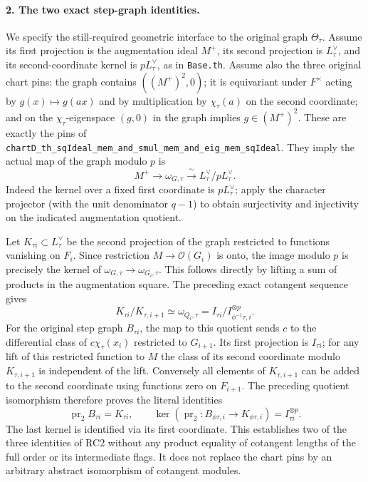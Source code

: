 \paragraph{2. The two exact step-graph identities.}
We specify the still-required geometric interface to the
original graph \(\Theta_\tau\).
Assume its first projection is the augmentation ideal \(M^+\),
its second projection is \(L_\tau^\vee\), and its second-coordinate
kernel is \(pL_\tau^\vee\), as in \texttt{Base.th}.
Assume also the three original chart pins: the graph contains
\(((M^+)^2,0)\); it is equivariant under \(F^\times\) acting by
\(g(x)\mapsto g(ax)\) and by multiplication by \(\chi_\tau(a)\)
on the second coordinate; and on the \(\chi_\tau\)-eigenspace
\((g,0)\) in the graph implies \(g\in(M^+)^2\).
These are exactly the pins of
\texttt{chartD\_th\_sqIdeal\_mem\_and\_smul\_mem\_and\_eig\_mem\_sqIdeal}.
They imply the actual map of the graph modulo \(p\) is
\[
 M^+\longrightarrow\omega_{G,\tau}
               \xrightarrow{\ \sim\ } L_\tau^\vee/pL_\tau^\vee.
\]
Indeed the kernel over a fixed first coordinate is
\(pL_\tau^\vee\); apply the character projector (with the
unit denominator \(q-1\)) to obtain surjectivity and
injectivity on the indicated augmentation quotient.

Let \(K_{\tau i}\subset L_\tau^\vee\) be the second
projection of the graph restricted to functions vanishing on
\(F_i\). Since restriction \(M\to\mathcal O(G_i)\) is onto,
the image modulo \(p\) is precisely the kernel of
\(\omega_{G,\tau}\to\omega_{G_i,\tau}\). This follows directly
by lifting a sum of products in the augmentation square.
The preceding exact cotangent sequence gives
\[
 K_{\tau i}/K_{\tau,i+1}
       \simeq\omega_{Q_i,\tau}
       =I_{\tau i}/I_{\phi^{-1}\tau,i}^{\otimes p}.
\]
For the original step graph \(B_{\tau i}\), the map to this
quotient sends \(c\) to the differential class of
\(c\chi_\tau(x_i)\) restricted to \(G_{i+1}\).
Its first projection is \(I_{\tau i}\); for any lift of this
restricted function to \(M\) the class of its second coordinate
modulo \(K_{\tau,i+1}\) is independent of the lift.
Conversely all elements of \(K_{\tau,i+1}\) can be added to the
second coordinate using functions zero on \(F_{i+1}\).
The preceding quotient isomorphism therefore proves the
literal identities
\[
 \operatorname{pr}_2 B_{\tau i}=K_{\tau i},\qquad
 \ker(\operatorname{pr}_2:B_{\phi\tau,i}\to K_{\phi\tau,i})
     =I_{\tau i}^{\otimes p}.
\]
The last kernel is identified via its first coordinate.
This establishes two of the three identities of RC2 without
any product equality of cotangent lengths of the full order
or its intermediate flags. It does not replace the chart pins
by an arbitrary abstract isomorphism of cotangent modules.

